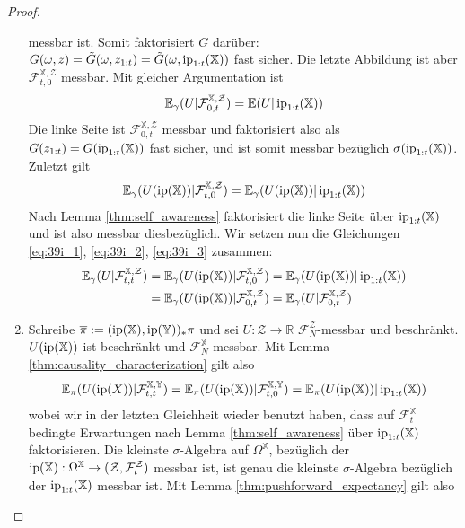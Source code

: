 \begin{proof}
\begin{enumerate}
messbar ist. Somit faktorisiert $G$ darüber: $G(\omega, z) = \tilde{G}(\omega, z_{1:t}) = \tilde{G}(\omega, \operatorname{ip}_{1:t}(\mathbb{X}))$ fast sicher. Die letzte Abbildung ist aber $\mathcal{F}_{t,0}^{\mathbb{X}, \mathcal{Z}}$ messbar. Mit gleicher Argumentation ist 
\begin{equation}\label{eq:39i_2}
\mathbb{E}_\gamma(U \vert \mathcal{F}_{0, t}^{\mathbb{X}, \mathcal{Z}}) = \mathbb{E}(U \vert \operatorname{ip}_{1:t}(\mathbb{X}))
\end{equation}
Die linke Seite ist $\mathcal{F}_{0, t}^{\mathbb{X}, \mathcal{Z}}$ messbar und faktorisiert also als $G(z_{1:t})=G(\operatorname{ip}_{1:t}(\mathbb{X}))$ fast sicher, und ist somit messbar bezüglich $\sigma(\operatorname{ip}_{1:t}(\mathbb{X}))$.
Zuletzt gilt 
\begin{equation}\label{eq:39i_3}
\mathbb{E}_\gamma(U(\operatorname{ip}(\mathbb{X}))\vert \mathcal{F}_{t, 0}^{\mathbb{X}, \mathcal{Z}}) = \mathbb{E}_\gamma(U(\operatorname{ip}(\mathbb{X})) \vert \operatorname{ip}_{1:t}(\mathbb{X}))
\end{equation}
Nach Lemma \ref{thm:self_awareness} faktorisiert die linke Seite über $\operatorname{ip}_{1:t}(\mathbb{X})$ und ist also messbar diesbezüglich. Wir setzen nun die Gleichungen \ref{eq:39i_1}, \ref{eq:39i_2}, \ref{eq:39i_3} zusammen:
\begin{align*}
    \mathbb{E}_\gamma(U \vert \mathcal{F}_{t,t}^{\mathbb{X}, \mathcal{Z}}) &= \mathbb{E}_\gamma(U(\operatorname{ip}(\mathbb{X})) \vert \mathcal{F}_{t, 0}^{\mathbb{X}, \mathcal{Z}}) 
    = \mathbb{E}_\gamma(U(\operatorname{ip}(\mathbb{X}))\vert \operatorname{ip}_{1:t}(\mathbb{X})) \\
    &= \mathbb{E}_\gamma(U(\operatorname{ip}(\mathbb{X}))\vert \mathcal{F}_{0, t}^{\mathbb{X}, \mathcal{Z}}) = \mathbb{E}_\gamma(U \vert \mathcal{F}_{0, t}^{\mathbb{X}, \mathcal{Z}})
\end{align*}
\item Schreibe $\overline\pi:=(\operatorname{ip}(\mathbb{X}), \operatorname{ip}(\mathbb{Y}))_* \pi$ und sei $U:\mathcal{Z}\rightarrow \mathbb{R}$ $\mathcal{F}_{N}^{\mathcal{Z}}$-messbar und beschränkt. $U(\operatorname{ip}(\mathbb{X}))$ ist beschränkt und $\mathcal{F}_N^\mathbb{X}$ messbar. Mit Lemma \ref{thm:causality_characterization} gilt also
\begin{equation}\label{eq:310_0}
    \mathbb{E}_\pi(U(\operatorname{ip}(X))\vert \mathcal{F}_{t,t}^{\mathbb{X}, \mathbb{Y}}) = \mathbb{E}_\pi(U(\operatorname{ip}(\mathbb{X}))\vert \mathcal{F}_{t, 0}^{\mathbb{X}, \mathbb{Y}}) = \mathbb{E}_\pi(U(\operatorname{ip}(\mathbb{X})) \vert \operatorname{ip}_{1:t}(\mathbb{X}))
\end{equation}
wobei wir in der letzten Gleichheit wieder benutzt haben, dass auf $\mathcal{F}_t^\mathbb{X}$ bedingte Erwartungen nach Lemma \ref{thm:self_awareness} über $\operatorname{ip}_{1:t}(\mathbb{X})$ faktorisieren. Die kleinste $\sigma$-Algebra auf $\Omega^\mathbb{X}$, bezüglich der $\operatorname{ip}(\mathbb{X}): \Omega^{\mathbb{X}} \rightarrow (\mathcal{Z}, \mathcal{F}_t^\mathcal{Z})$ messbar ist, ist genau die kleinste $\sigma$-Algebra bezüglich der $\operatorname{ip}_{1:t}(\mathbb{X})$ messbar ist. Mit Lemma \ref{thm:pushforward_expectancy} gilt also

\end{enumerate}
\end{proof}
